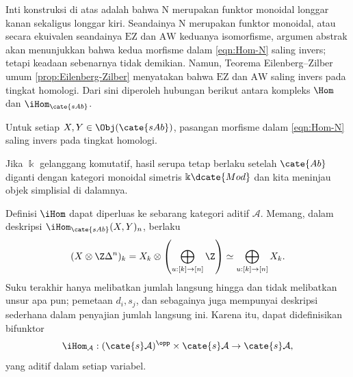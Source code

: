 Inti konstruksi di atas adalah bahwa $\mathrm{N}$ merupakan funktor monoidal
longgar kanan sekaligus longgar kiri. Seandainya $\mathrm{N}$ merupakan
funktor monoidal, atau secara ekuivalen seandainya $\mathrm{EZ}$ dan
$\mathrm{AW}$ keduanya isomorfisme, argumen abstrak akan menunjukkan
bahwa kedua morfisme dalam \eqref{eqn:Hom-N} saling invers; tetapi keadaan
sebenarnya tidak demikian. Namun, Teorema Eilenberg--Zilber umum
\ref{prop:Eilenberg-Zilber} menyatakan bahwa $\mathrm{EZ}$ dan $\mathrm{AW}$
saling invers pada tingkat homologi. Dari sini diperoleh hubungan berikut
antara kompleks $\Hom$ dan $\iHom_{\cate{sAb}}$.

\begin{proposition}
	Untuk setiap $X,Y\in\Obj(\cate{sAb})$, pasangan morfisme dalam
	\eqref{eqn:Hom-N} saling invers pada tingkat homologi.
\end{proposition}

Jika $\Bbbk$ gelanggang komutatif, hasil serupa tetap berlaku setelah
$\cate{Ab}$ diganti dengan kategori monoidal simetris $\Bbbk\dcate{Mod}$ dan
kita meninjau objek simplisial di dalamnya.

\begin{remark}
	Definisi $\iHom$ dapat diperluas ke sebarang kategori aditif $\mathcal{A}$.
	Memang, dalam deskripsi $\iHom_{\cate{sAb}}(X,Y)_n$, berlaku
	\[
	(X\otimes\Z\Delta^n)_k
	=X_k\otimes\left(\bigoplus_{u:[k]\to[n]}\Z\right)
	\simeq\bigoplus_{u:[k]\to[n]}X_k.
	\]
	Suku terakhir hanya melibatkan jumlah langsung hingga dan tidak melibatkan
	unsur apa pun; pemetaan $d_i,s_j$, dan sebagainya juga mempunyai deskripsi
	sederhana dalam penyajian jumlah langsung ini. Karena itu, dapat
	didefinisikan bifunktor
	\[
	\iHom_{\mathcal{A}}:(\cate{s}\mathcal{A})^{\opp}
	\times\cate{s}\mathcal{A}\to\cate{s}\mathcal{A},
	\]
	yang aditif dalam setiap variabel.
\end{remark}
